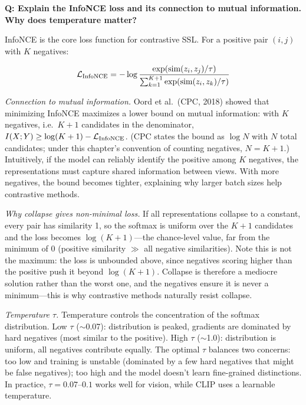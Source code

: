 \begin{interviewq}
\textbf{Q: Explain the InfoNCE loss and its connection to mutual information. Why does temperature matter?}

 \quad {} \quad \badgefreq{\freqmed}

\stronganswer InfoNCE is the core loss function for contrastive SSL. For a positive pair $(i, j)$ with $K$ negatives:

$$\mathcal{L}_{\text{InfoNCE}} = -\log \frac{\exp(\text{sim}(z_i, z_j)/\tau)}{\sum_{k=1}^{K+1} \exp(\text{sim}(z_i, z_k)/\tau)}$$

\textit{Connection to mutual information.} Oord et al.\ (CPC, 2018) showed that minimizing InfoNCE maximizes a lower bound on mutual information: with $K$ negatives, i.e.\ $K+1$ candidates in the denominator, $I(X; Y) \geq \log(K+1) - \mathcal{L}_{\text{InfoNCE}}$. (CPC states the bound as $\log N$ with $N$ total candidates; under this chapter's convention of counting negatives, $N = K+1$.) Intuitively, if the model can reliably identify the positive among $K$ negatives, the representations must capture shared information between views. With more negatives, the bound becomes tighter, explaining why larger batch sizes help contrastive methods.

\textit{Why collapse gives non-minimal loss.} If all representations collapse to a constant, every pair has similarity 1, so the softmax is uniform over the $K+1$ candidates and the loss becomes $\log(K+1)$---the chance-level value, far from the minimum of 0 (positive similarity $\gg$ all negative similarities). Note this is not the maximum: the loss is unbounded above, since negatives scoring higher than the positive push it beyond $\log(K+1)$. Collapse is therefore a mediocre solution rather than the worst one, and the negatives ensure it is never a minimum---this is why contrastive methods naturally resist collapse.

\textit{Temperature $\tau$.} Temperature controls the concentration of the softmax distribution. Low $\tau$ ($\sim$0.07): distribution is peaked, gradients are dominated by hard negatives (most similar to the positive). High $\tau$ ($\sim$1.0): distribution is uniform, all negatives contribute equally. The optimal $\tau$ balances two concerns: too low and training is unstable (dominated by a few hard negatives that might be false negatives); too high and the model doesn't learn fine-grained distinctions. In practice, $\tau = 0.07$--$0.1$ works well for vision, while CLIP uses a learnable temperature.


\end{interviewq}
